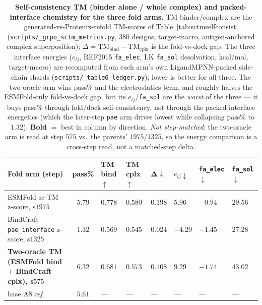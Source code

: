 \documentclass[11pt]{article}
\newcommand{\ttk}[1]{\texttt{\small #1}}
\begin{document}
\begin{table}[htbp]
\centering
\footnotesize
\setlength{\tabcolsep}{5pt}
{\renewcommand{\arraystretch}{1.3}%
\begin{tabular}{@{}>{\raggedright\arraybackslash}p{4.6cm}
                    c
                    >{\centering\arraybackslash}p{1.35cm}
                    >{\centering\arraybackslash}p{1.35cm}
                    >{\centering\arraybackslash}p{0.9cm}
                    >{\centering\arraybackslash}p{1.15cm}
                    >{\centering\arraybackslash}p{1.25cm}
                    >{\centering\arraybackslash}p{1.15cm}@{}}
\toprule
\textbf{Fold arm (step)} & \textbf{pass\%} & \textbf{TM bind} $\uparrow$ & \textbf{TM cplx} $\uparrow$ & $\boldsymbol{\Delta}\downarrow$ & $e_{lj}\downarrow$ & \ttk{fa\_elec} $\downarrow$ & \ttk{fa\_sol} $\downarrow$\\
\midrule
ESMFold sc-TM z-score, s$1975$                  & $5.79$ & $\mathbf{0.778}$ & $\mathbf{0.580}$ & $0.198$ & $5.96$ & $-0.94$ & $29.56$\\
BindCraft \ttk{pae\_interface} z-score, s$1325$ & $1.32$ & $0.569$ & $0.545$ & $\mathbf{0.024}$ & $\mathbf{-4.29}$ & $-1.45$ & $\mathbf{27.28}$\\
\rowcolor{aTint}\textbf{Two-oracle TM (ESMFold bind $+$ BindCraft cplx), s$575$} & $\mathbf{6.32}$ & $0.681$ & $0.573$ & $0.108$ & $9.29$ & $\mathbf{-1.74}$ & $43.02$\\
\midrule
base A8 \emph{ref}                              & $5.61$ & --- & --- & --- & --- & --- & ---\\
\bottomrule
\end{tabular}}
\caption{\textbf{Self-consistency TM (binder alone / whole complex) and packed-interface chemistry for
the three fold arms.} TM binder/complex are the generated-vs-Protenix-refold TM-scores of
Table~\ref{tab:sctmselfconsist} (\ttk{scripts/\_grpo\_sctm\_metrics.py}, $380$ designs, target-macro,
antigen-anchored complex superposition); $\Delta=$TM$_{\text{bind}}-$TM$_{\text{cplx}}$ is the
fold-vs-dock gap. The three interface energies ($e_{lj}$, REF2015 \ttk{fa\_elec}, LK \ttk{fa\_sol}
desolvation, kcal/mol, target-macro) are recomputed from each arm's own LigandMPNN-packed side-chain
shards (\ttk{scripts/\_table6\_ledger.py}); lower is better for all three. The two-oracle arm wins
pass\% and the electrostatics term, and roughly halves the ESMFold-only fold-vs-dock gap, but its
$e_{lj}$/\ttk{fa\_sol} are the \emph{worst} of the three --- it buys pass\% through fold/dock
self-consistency, not through the packed interface energetics (which the later-step \ttk{pae} arm
drives lowest while collapsing pass\% to $1.32$). \textbf{Bold} $=$ best in column by direction.
\emph{Not step-matched}: the two-oracle arm is read at step $575$ vs.\ the parents' $1975$/$1325$, so
the energy comparison is a cross-step read, not a matched-step delta.}
\label{tab:twooracletm}
\end{table}
\end{document}
